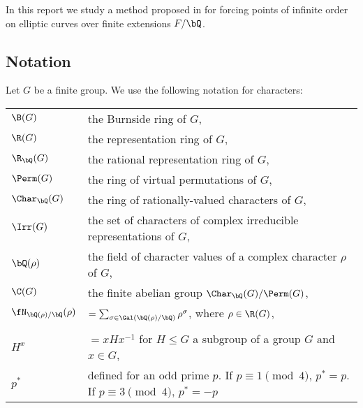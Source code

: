 In this report we study a method proposed in \cite{DEW1} for forcing points of infinite order on elliptic curves over finite extensions $F / \bQ$. 

\subsection*{Notation}
Let $G$ be a finite group. We use the following notation for characters:

\bigskip

\begin{tabular}{l | l}
    $\B(G)$ & the Burnside ring of $G$, \\
    $\R(G)$ & the representation ring of $G$, \\
    $\R_{\bQ}(G)$ & the rational representation ring of $G$, \\
    $\Perm(G)$ & the ring of virtual permutations of $G$, \\
    $\Char_{\bQ}(G)$ & the ring of rationally-valued characters of $G$,\\
    $\Irr(G)$ & the set of characters of complex irreducible representations of $G$, \\
    $\bQ(\rho)$ & the field of character values of a complex character $\rho$ of $G$, \\
    $\C(G)$ & the finite abelian group $\Char_{\bQ}(G) / \Perm(G)$, \\ 
    $\repnorm{\rho}$ &  $ = \sum_{\sigma \in \Gal(\bQ(\rho) / \bQ)} \rho^{\sigma}$, where $\rho \in \R(G)$,\\
    \\
    $H^{x}$ & $= xHx^{-1}$  for $H \leq G$ a subgroup of a group $G$ and $x \in G$,\\
    $p^*$ & defined for an odd prime $p$. If $p \equiv 1 \pmod 4$, $p^* = p$. If $p \equiv 3 \pmod 4$, $p^* = -p$
\end{tabular}
\vspace{2em}


